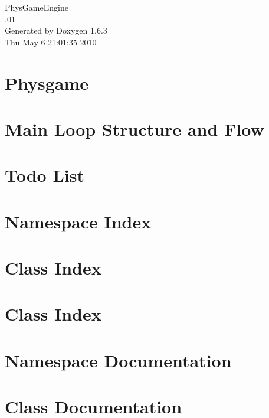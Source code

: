 \documentclass[a4paper]{book}
\begin{document}
\hypersetup{pageanchor=false}
\begin{titlepage}
\vspace*{7cm}
\begin{center}
{\Large PhysGameEngine \\[1ex]\large .01 }\\
\vspace*{1cm}
{\large Generated by Doxygen 1.6.3}\\
\vspace*{0.5cm}
{\small Thu May 6 21:01:35 2010}\\
\end{center}
\end{titlepage}
\clearemptydoublepage
{}
\tableofcontents
\clearemptydoublepage
{}
\hypersetup{pageanchor=true}
\chapter{Physgame}
\label{index}\hypertarget{index}{}
\chapter{Main Loop Structure and Flow}
\label{mainloop1}
\hypertarget{mainloop1}{}

\chapter{Todo List}
\label{todo}
\hypertarget{todo}{}

\chapter{Namespace Index}

\chapter{Class Index}

\chapter{Class Index}

\chapter{Namespace Documentation}

\chapter{Class Documentation}















\printindex
\end{document}
